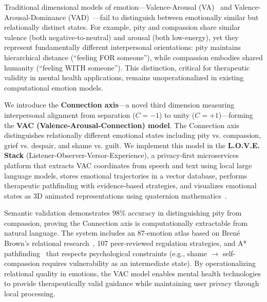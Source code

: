Traditional dimensional models of emotion—Valence-Arousal (VA)~\cite{russell1980} and Valence-Arousal-Dominance (VAD)~\cite{mehrabian1974}—fail to distinguish between emotionally similar but relationally distinct states. For example, pity and compassion share similar valence (both negative-to-neutral) and arousal (both low-energy), yet they represent fundamentally different interpersonal orientations: pity maintains hierarchical distance (``feeling FOR someone''), while compassion embodies shared humanity (``feeling WITH someone''). This distinction, critical for therapeutic validity in mental health applications, remains unoperationalized in existing computational emotion models.

We introduce the \textbf{Connection axis}—a novel third dimension measuring interpersonal alignment from separation ($C = -1$) to unity ($C = +1$)—forming the \textbf{VAC (Valence-Arousal-Connection) model}. The Connection axis distinguishes relationally different emotional states including pity vs. compassion, grief vs. despair, and shame vs. guilt. We implement this model in the \textbf{L.O.V.E. Stack} (Listener-Observer-Versor-Experience), a privacy-first microservices platform that extracts VAC coordinates from speech and text using local large language models, stores emotional trajectories in a vector database, performs therapeutic pathfinding with evidence-based strategies, and visualizes emotional states as 3D animated representations using quaternion mathematics~\cite{shoemake1985}.

Semantic validation demonstrates 98\% accuracy in distinguishing pity from compassion, proving the Connection axis is computationally extractable from natural language. The system includes an 87-emotion atlas based on Brené Brown's relational research~\cite{brown2021}, 107 peer-reviewed regulation strategies, and A* pathfinding~\cite{hart1968} that respects psychological constraints (e.g., shame $\rightarrow$ self-compassion requires vulnerability as an intermediate state). By operationalizing relational quality in emotions, the VAC model enables mental health technologies to provide therapeutically valid guidance while maintaining user privacy through local processing.
